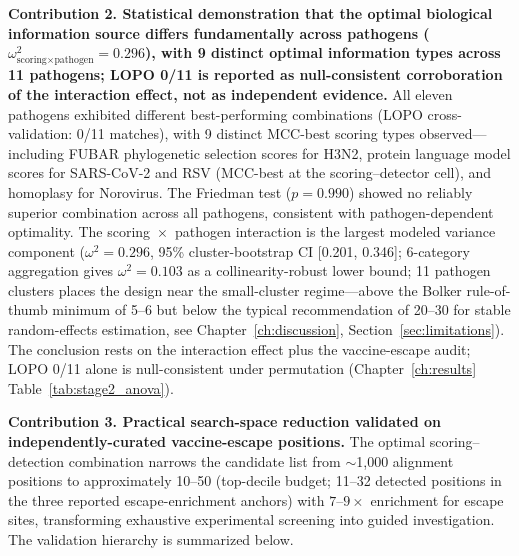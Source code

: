 \textbf{Contribution 2. Statistical demonstration that the optimal biological information source differs fundamentally across pathogens ($\omega^2_{\text{scoring} \times \text{pathogen}} = 0.296$), with 9 distinct optimal information types across 11 pathogens; LOPO 0/11 is reported as null-consistent corroboration of the interaction effect, not as independent evidence.}
All eleven pathogens exhibited different best-performing combinations (LOPO cross-validation: 0/11 matches), with 9 distinct MCC-best scoring types observed---including FUBAR phylogenetic selection scores for H3N2, protein language model scores for SARS-CoV-2 and RSV (MCC-best at the scoring--detector cell), and homoplasy for Norovirus.
The Friedman test ($p = 0.990$) showed no reliably superior combination across all pathogens, consistent with pathogen-dependent optimality.
The scoring~$\times$~pathogen interaction is the largest modeled variance component ($\omega^2 = 0.296$, 95\% cluster-bootstrap CI [0.201, 0.346]; 6-category aggregation gives $\omega^2 = 0.103$ as a collinearity-robust lower bound; 11 pathogen clusters places the design near the small-cluster regime---above the Bolker rule-of-thumb minimum of 5--6 but below the typical recommendation of 20--30 for stable random-effects estimation, see Chapter~\ref{ch:discussion}, Section~\ref{sec:limitations}). The conclusion rests on the interaction effect plus the vaccine-escape audit; LOPO 0/11 alone is null-consistent under permutation (Chapter~\ref{ch:results} Table~\ref{tab:stage2_anova}).

\textbf{Contribution 3. Practical search-space reduction validated on independently-curated vaccine-escape positions.}
The optimal scoring--detection combination narrows the candidate list from $\sim$1{,}000 alignment positions to approximately 10--50 (top-decile budget; 11--32 detected positions in the three reported escape-enrichment anchors) with $7$--$9\times$ enrichment for escape sites, transforming exhaustive experimental screening into guided investigation. The validation hierarchy is summarized below.


